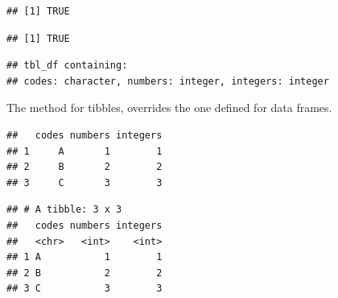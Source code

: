 \documentclass[krantz2]{krantz}\usepackage{knitr}%
\begin{document}
\begin{knitrout}\footnotesize
{}\color{fgcolor}\begin{kframe}
\begin{alltt}
 \hlkwb{<-} \hlstd{(} \hlstd{=} \hlstd{(}\hlstd{,} \hlstd{,} \hlstd{),}  \hlstd{=} \hlopt{:}\hlstd{,}  \hlstd{=} \hlopt{:}\hlstd{)}
\end{alltt}
\begin{verbatim}
## [1] TRUE
\end{verbatim}
\begin{alltt}
\end{alltt}
\begin{verbatim}
## [1] TRUE
\end{verbatim}
\begin{alltt}
\end{alltt}
\begin{verbatim}
## tbl_df containing:
## codes: character, numbers: integer, integers: integer
\end{verbatim}
\end{kframe}
\end{knitrout}

The  method for tibbles, overrides the one defined for data frames.

\begin{knitrout}\footnotesize
{}\color{fgcolor}\begin{kframe}
\begin{alltt}
\end{alltt}
\begin{verbatim}
##   codes numbers integers
## 1     A       1        1
## 2     B       2        2
## 3     C       3        3
\end{verbatim}
\begin{alltt}
\end{alltt}
\begin{verbatim}
## # A tibble: 3 x 3
##   codes numbers integers
##   <chr>   <int>    <int>
## 1 A           1        1
## 2 B           2        2
## 3 C           3        3
\end{verbatim}
\end{kframe}
\end{knitrout}
\end{document}
